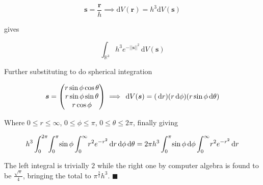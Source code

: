 \documentclass[../main.tex]{subfiles}
\begin{document}
\begin{equation}
    \bm{s} = \frac{\bm{r}}{h} \implies \mathrm{d}V(\bm{r}) = h^3 \mathrm{d}V(\bm{s})
\end{equation}

gives

\begin{equation}
    {\displaystyle \int_{\mathbb{R}^3} \!
        h^3 e^{-||\bm{s}||^2}
    \, \mathrm{d} V(\bm{s}) }
\end{equation}

Further substituting to do spherical integration

\begin{equation}
    \bm{s} =
    \begin{pmatrix}
        r \sin \phi \cos \theta \\
        r \sin \phi \sin \theta \\
        r \cos \phi
    \end{pmatrix}
    \implies \,\mathrm{d} V(\bm{s}) = (\,\mathrm{d} r) (r \,\mathrm{d} \phi) (r \sin \phi \,\mathrm{d} \theta)
\end{equation}

Where $0 \le r \le \infty$, $0 \le \phi \le \pi$, $0 \le \theta \le 2\pi$, finally giving

\begin{equation}
    h^3 \int_0^{2\pi} \! \int_0^\pi \! \sin \phi
        \int_0^\infty \! r^2 e^{-r^2} \,\mathrm{d} r
        \,\mathrm{d} \phi \,\mathrm{d} \theta
    = 2\pi h^3 \int_0^\pi \! \sin \phi \,\mathrm{d} \phi \int_0^\infty \! r^2 e^{-r^2} \,\mathrm{d} r
\end{equation}

The left integral is trivially $2$ while the right one by computer algebra is found to be
$\frac{\sqrt{\pi}}{4}$, bringing the total to $\pi^\frac{3}{2} h^3$. $\blacksquare$
\end{document}
